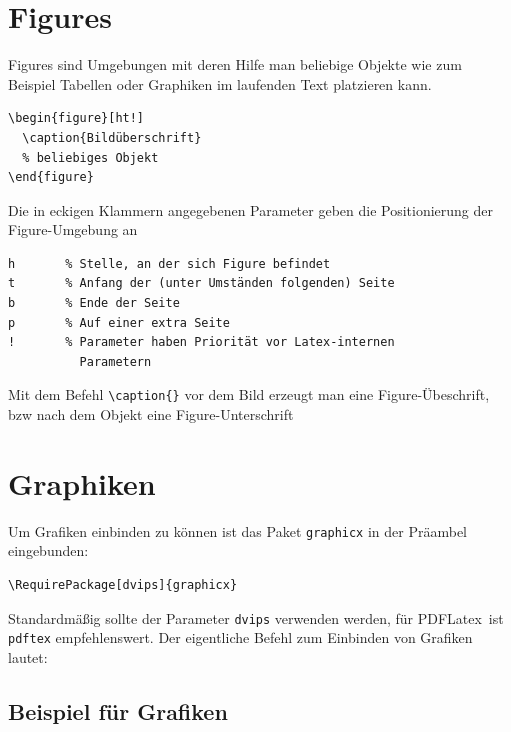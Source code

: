\documentclass{like}
\begin{document}
\section{Figures}
Figures sind Umgebungen mit deren Hilfe man beliebige Objekte wie zum Beispiel
Tabellen oder Graphiken im laufenden Text platzieren kann.\nopagebreak\par\medskip\nopagebreak
\qquad\begin{minipage}{0.8\textwidth}
\begin{verbatim}
\begin{figure}[ht!]
  \caption{Bildüberschrift}
  % beliebiges Objekt
\end{figure}
\end{verbatim}
\end{minipage}\par\bigskip
Die in eckigen Klammern angegebenen Parameter geben die Positionierung der Figure-Umgebung an \nopagebreak\par\medskip\nopagebreak
\qquad\begin{minipage}{0.8\textwidth}
\begin{verbatim}
h       % Stelle, an der sich Figure befindet
t       % Anfang der (unter Umständen folgenden) Seite
b       % Ende der Seite
p       % Auf einer extra Seite
!       % Parameter haben Priorität vor Latex-internen
          Parametern
\end{verbatim}
\end{minipage}\par\bigskip
Mit dem Befehl \verb+\caption{}+ vor dem Bild erzeugt man eine Figure-Übeschrift, bzw nach dem Objekt eine Figure-Unterschrift

\section{Graphiken}
Um Grafiken einbinden zu können ist das Paket \verb+graphicx+ in der Präambel eingebunden:
\qquad\begin{minipage}{0.8\textwidth}
\begin{verbatim}
\RequirePackage[dvips]{graphicx}
\end{verbatim}
\end{minipage}\par\bigskip
Standardmäßig sollte der Parameter \verb+dvips+ verwenden werden, für \glqq PDFLatex\grqq \, ist \verb+pdftex+ empfehlenswert.
Der eigentliche Befehl zum Einbinden von Grafiken lautet:
\subsection{Beispiel für Grafiken}
\end{document}
